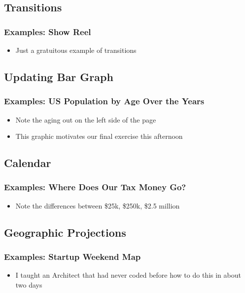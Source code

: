 \documentclass{beamer}
\begin{document}
\subsection{Transitions}


\begin{frame}
\frametitle{Examples: Show Reel}
\begin{itemize}
\item Just a gratuitous example of transitions
\end{itemize}
\end{frame}


\subsection{Updating Bar Graph}


\begin{frame}
\frametitle{Examples: US Population by Age Over the Years}
\begin{itemize}
\item Note the aging out on the left side of the page
\item This graphic motivates our final exercise this afternoon
\end{itemize}
\end{frame}


\subsection{Calendar}


\begin{frame}
\frametitle{Examples: Where Does Our Tax Money Go?}
\begin{itemize}
\item Note the differences between \$25k, \$250k, \$2.5 million
\end{itemize}
\end{frame}


\subsection{Geographic Projections}


\begin{frame}
\frametitle{Examples: Startup Weekend Map}
\begin{itemize}
\item I taught an Architect that had never coded before how to do this in about two days
\end{itemize}
\end{frame}
\end{document}
